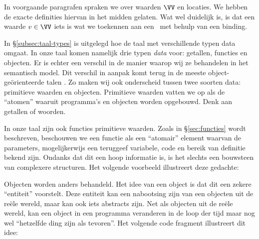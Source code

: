 In voorgaande paragrafen spraken we over waarden $\VV$ en locaties. We hebben de exacte definities hiervan in het midden gelaten. Wat wel duidelijk is, is dat een waarde $v \in \VV$ iets is wat we toekennen aan een \Id\ met behulp van een binding.

In §\ref{subsec:taal-types} is uitgelegd hoe de taal met verschillende typen data omgaat. In onze taal komen namelijk drie typen \emph{data} voor: getallen, functies en objecten. Er is echter een verschil in de manier waarop wij ze behandelen in het semantisch model. Dit verschil in aanpak komt terug in de meeste object-geörienteerde talen \citep{java,csharp}.
Zo maken wij ook onderscheid tussen twee soorten data: primitieve waarden en objecten. Primitieve waarden vatten we op als de “atomen” waaruit programma's en objecten worden opgebouwd. Denk aan getallen of woorden.

\begin{NoBreak}
  \codeFragmentCaption
\end{NoBreak}

In onze taal zijn ook functies primitieve waarden. Zoals in §\ref{sec:functies} wordt beschreven, beschouwen we een functie als een “atomair” element waarvan de parameters, mogelijkerwijs een teruggeef variabele, code en bereik van definitie bekend zijn. Ondanks dat dit een hoop informatie is, is het slechts een bouwsteen van complexere structuren. Het volgende voorbeeld illustreert deze gedachte:

\begin{NoBreak}
  \codeFragmentCaption
\end{NoBreak}

Objecten worden anders behandeld. Het idee van een object is dat dit een zekere “entiteit” voorstelt. Deze entiteit kan een nabootsing zijn van een objecten uit de reële wereld, maar kan ook iets abstracts zijn. Net als objecten uit de reële wereld, kan een object in een programma veranderen in de loop der tijd maar nog wel “hetzelfde ding zijn als tevoren”. Het volgende code fragment illustreert dit idee:

